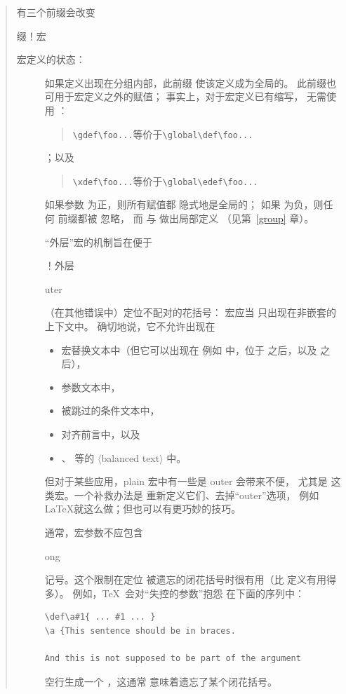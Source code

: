 \documentclass[a4paper]{rapport3}
\makeatletter
\def\gr#1{$\langle$#1$\rangle$}\def\key#1{{\tt#1}}
\newenvironment{disp}{\begin{quotation}}{\end{quotation}}
\def\gram#1{\gr{#1}}%
\def\term#1\par{\index{#1}}
\def\cstoidx#1\par{\index{#1@\cs{#1}}}
\def\csidx#1{\cstoidx #1\par\cs{#1}}
\makeatother
\begin{document}
\begin{disp}
有三个前缀会改变
\term 前缀！宏\par
宏定义的状态：\begin{description}
\item [\csidx{global}]
如果定义出现在分组内部，此前缀
使该定义成为全局的。
此前缀也可用于宏定义之外的赋值；
事实上，对于宏定义已有缩写，
无需使用 ：
\begin{disp}\verb>\gdef\foo...>\quad 等价于\quad \verb>\global\def\foo...>
\end{disp}；以及
\begin{disp}\verb>\xdef\foo...>\quad 等价于\quad \verb>\global\edef\foo...>
\end{disp}

如果参数 
为正，则所有赋值都
隐式地是全局的；
如果  为负，则任何  前缀都被
忽略，
而  与  做出局部定义
（见第~\ref{group} 章）。

\item []
“外层”宏的机制旨在便于
\term 宏！外层\par\cstoidx outer\par
（在其他错误中）定位不配对的花括号：
宏应当
只出现在非嵌套的上下文中。
确切地说，它不允许出现在
\begin{itemize}
\item 宏替换文本中（但它可以出现在
    例如  中，位于
     之后，以及  之后），
\item 参数文本中，
\item 被跳过的条件文本中，
\item 对齐前言中，以及
\item {}、 等的 \gram{balanced text} 中。\end{itemize}
但对于某些应用，plain 宏中有一些是 outer 会带来不便，
尤其是  这类宏。一个补救办法是
重新定义它们、去掉“outer”选项，
例如 \LaTeX 就这么做；但也可以有更巧妙的技巧。

\item []
通常，宏参数不应包含
\cstoidx long\par
{} 记号。这个限制在定位
被遗忘的闭花括号时很有用（比  定义有用得多）。
例如，\TeX\ 会对“失控的参数”抱怨
在下面的序列中：\begin{verbatim}
\def\a#1{ ... #1 ... }
\a {This sentence should be in braces.

And this is not supposed to be part of the argument
\end{verbatim}
空行生成一个 ，这通常
意味着遗忘了某个闭花括号。


\end{description}
\end{disp}
\end{document}
